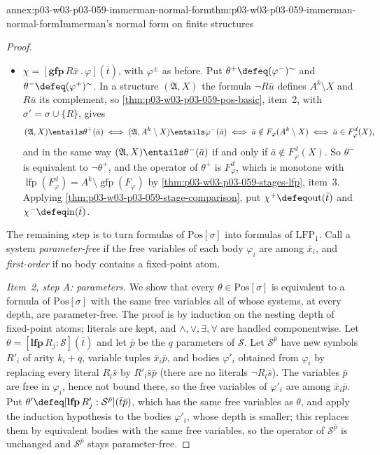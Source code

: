 \begin{annexitem}{annex:p03-w03-p03-059-immerman-normal-form}{thm:p03-w03-p03-059-immerman-normal-form}{Immerman's normal form on finite structures}
\begin{proof}
\begin{itemize}
       \(\bar t,\bar p\), the free variables of \(\chi\).
 \item \(\chi=[\mathbf{gfp}\,R\bar x\,.\,\varphi](\bar t)\), with
       \(\varphi^\pm\) as before. Put
       \(\theta^+\defeq(\varphi^-)^{\sim}\) and
       \(\theta^-\defeq(\varphi^+)^{\sim}\). In a structure
       \((\mathfrak A,X)\) the formula \(\neg R\bar u\) defines
       \(A^k\setminus X\) and \(R\bar u\) its complement, so
       \cref{thm:p03-w03-p03-059-pos-basic}, item~2, with
       \(\sigma'=\sigma\cup\{R\}\), gives
       \[
        (\mathfrak A,X)\entails\theta^+(\bar a)\iff
        (\mathfrak A,A^k\setminus X)\entails\varphi^-(\bar a)\iff
        \bar a\notin F_\varphi(A^k\setminus X)\iff
        \bar a\in F^d_\varphi(X),
       \]
       and in the same way \((\mathfrak A,X)\entails\theta^-(\bar a)\) if
       and only if \(\bar a\notin F^d_\varphi(X)\). So \(\theta^-\) is
       equivalent to \(\neg\theta^+\), and the operator of \(\theta^+\) is
       \(F^d_\varphi\), which is monotone with
       \(\operatorname{lfp}(F^d_\varphi)=A^k\setminus
       \operatorname{gfp}(F_\varphi)\) by
       \cref{thm:p03-w03-p03-059-stages-lfp}, item~3. Applying
       \cref{thm:p03-w03-p03-059-stage-comparison}, put
       \(\chi^+\defeq\mathrm{out}(\bar t)\) and
       \(\chi^-\defeq\mathrm{in}(\bar t)\).
\end{itemize}
The remaining step is to turn formulas of \(\mathrm{Pos}[\sigma]\) into
formulas of \(\mathrm{LFP}_1\). Call a system \emph{parameter-free} if the
free variables of each body \(\varphi_i\) are among \(\bar x_i\), and
\emph{first-order} if no body contains a fixed-point atom.

\emph{Item~2, step A: parameters.} We show that every
\(\theta\in\mathrm{Pos}[\sigma]\) is equivalent to a formula of
\(\mathrm{Pos}[\sigma]\) with the same free variables all of whose systems,
at every depth, are parameter-free. The proof is by induction on the
nesting depth of fixed-point atoms; literals are kept, and \(\land,\lor,
\exists,\forall\) are handled componentwise. Let
\(\theta=[\mathbf{lfp}\,R_j:\mathcal S](\bar t)\) and let \(\bar p\) be the
\(q\) parameters of \(\mathcal S\). Let \(\mathcal S^{\bar p}\) have new
symbols \(R'_i\) of arity \(k_i+q\), variable tuples \(\bar x_i\bar p\),
and bodies \(\varphi'_i\) obtained from \(\varphi_i\) by replacing every
literal \(R_l\bar s\) by \(R'_l\bar s\bar p\) (there are no literals
\(\neg R_l\bar s\)). The variables \(\bar p\) are free in \(\varphi_i\),
hence not bound there, so the free variables of \(\varphi'_i\) are among
\(\bar x_i\bar p\). Put
\(\theta'\defeq[\mathbf{lfp}\,R'_j:\mathcal S^{\bar p}](\bar t\bar p)\),
which has the same free variables as \(\theta\), and apply the induction
hypothesis to the bodies \(\varphi'_i\), whose depth is smaller; this
replaces them by equivalent bodies with the same free variables, so the
operator of \(\mathcal S^{\bar p}\) is unchanged and \(\mathcal
S^{\bar p}\) stays parameter-free.


\end{proof}
\end{annexitem}
